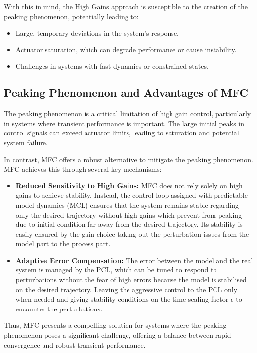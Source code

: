 With this in mind, the High Gains approach is susceptible to the creation of the peaking phenomenon, 
potentially leading to:

\begin{itemize}
    \item Large, temporary deviations in the system's response.
    \item Actuator saturation, which can degrade performance or cause instability.
    \item Challenges in systems with fast dynamics or constrained states.
\end{itemize}

\subsection{Peaking Phenomenon and Advantages of MFC}

The peaking phenomenon is a critical limitation of high gain control, particularly in systems where transient 
performance is important. The large initial peaks in control signals can exceed actuator limits, leading to 
saturation and potential system failure. 

In contrast, MFC offers a robust alternative to mitigate the peaking phenomenon. 
MFC achieves this through several key mechanisms:

\begin{itemize}
    \item \textbf{Reduced Sensitivity to High Gains:} MFC does not rely solely on high gains to achieve 
    stability. Instead, the control loop assigned with predictable model dynamics (MCL) ensures that the system
    remains stable regarding only the desired trajectory without high gains which prevent from peaking due to
    initial condition far away from the desired trajectory. Its stability is easily ensured by the gain choice 
    taking out the perturbation issues from the model part to the process part.
    \item \textbf{Adaptive Error Compensation:} The error between the model and the real system is managed by the
    PCL, which can be tuned to respond to perturbations without the fear of high errors because the model is
    stabilised on the desired trajectory. Leaving the aggressive control to the PCL only when needed and 
    giving stability conditions on the time scaling factor \(\epsilon\) to encounter the perturbations.
\end{itemize}

Thus, MFC presents a compelling solution for systems where the peaking phenomenon poses a significant 
challenge, offering a balance between rapid convergence and robust transient performance.

